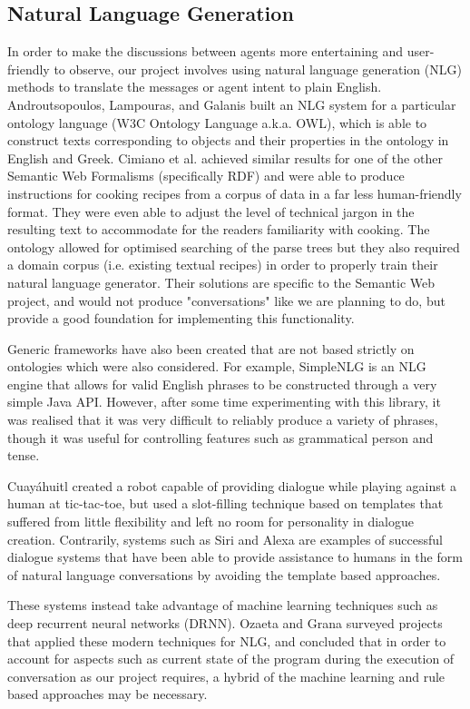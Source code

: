 \documentclass{article}
\begin{document}
\subsection{Natural Language Generation}

In order to make the discussions between agents more entertaining and user-friendly to observe, our project involves using natural language generation (NLG) methods to translate the messages or agent intent to plain English. Androutsopoulos, Lampouras, and Galanis \cite{owlnlg} built an NLG system for a particular ontology language (W3C Ontology Language a.k.a. OWL), which is able to construct texts corresponding to objects and their properties in the ontology in English and Greek. Cimiano et al. \cite{rdfnlg} achieved similar results for one of the other Semantic Web Formalisms (specifically RDF) and were able to produce instructions for cooking recipes from a corpus of data in a far less human-friendly format. They were even able to adjust the level of technical jargon in the resulting text to accommodate for the readers familiarity with cooking. The ontology allowed for optimised searching of the parse trees but they also required a domain corpus (i.e. existing textual recipes) in order to properly train their natural language generator. Their solutions are specific to the Semantic Web project, and would not produce "conversations" like we are planning to do, but provide a good foundation for implementing this functionality.

Generic frameworks have also been created that are not based strictly on ontologies which were also considered. For example, SimpleNLG \cite{simplenlg} is an NLG engine that allows for valid English phrases to be constructed through a very simple Java API. However, after some time experimenting with this library, it was realised that it was very difficult to reliably produce a variety of phrases, though it was useful for controlling features such as grammatical person and tense.

Cuayáhuitl \cite{robotgame} created a robot capable of providing dialogue while playing against a human at tic-tac-toe, but used a slot-filling technique based on templates that suffered from little flexibility and left no room for personality in dialogue creation. Contrarily, systems such as Siri and Alexa are examples of successful dialogue systems that have been able to provide assistance to humans in the form of natural language conversations by avoiding the template based approaches.

These systems instead take advantage of machine learning techniques such as deep recurrent neural networks (DRNN). Ozaeta and Grana \cite{dialoguesystems} surveyed projects that applied these modern techniques for NLG, and concluded that in order to account for aspects such as current state of the program during the execution of conversation as our project requires, a hybrid of the machine learning and rule based approaches may be necessary. 
\end{document}
